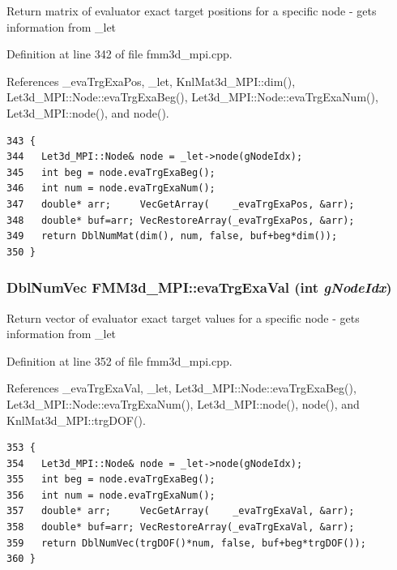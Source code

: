 Return matrix of evaluator exact target positions for a specific node - gets information from \_\-let 

Definition at line 342 of file fmm3d\_\-mpi.cpp.

References \_\-eva\-Trg\-Exa\-Pos, \_\-let, Knl\-Mat3d\_\-MPI::dim(), Let3d\_\-MPI::Node::eva\-Trg\-Exa\-Beg(), Let3d\_\-MPI::Node::eva\-Trg\-Exa\-Num(), Let3d\_\-MPI::node(), and node().

\footnotesize\begin{verbatim}343 {
344   Let3d_MPI::Node& node = _let->node(gNodeIdx);
345   int beg = node.evaTrgExaBeg();
346   int num = node.evaTrgExaNum();
347   double* arr;     VecGetArray(    _evaTrgExaPos, &arr);
348   double* buf=arr; VecRestoreArray(_evaTrgExaPos, &arr);
349   return DblNumMat(dim(), num, false, buf+beg*dim());
350 }
\end{verbatim}\normalsize 


\subsubsection{\setlength{\rightskip}{0pt plus 5cm}Dbl\-Num\-Vec FMM3d\_\-MPI::eva\-Trg\-Exa\-Val (int {\em g\-Node\-Idx})\hspace{0.3cm}{\tt  [protected]}}\label{classFMM3d__MPI_3ea3c7087a28b8d102c797d796aed4c2_3ea3c7087a28b8d102c797d796aed4c2}


Return vector of evaluator exact target values for a specific node - gets information from \_\-let 

Definition at line 352 of file fmm3d\_\-mpi.cpp.

References \_\-eva\-Trg\-Exa\-Val, \_\-let, Let3d\_\-MPI::Node::eva\-Trg\-Exa\-Beg(), Let3d\_\-MPI::Node::eva\-Trg\-Exa\-Num(), Let3d\_\-MPI::node(), node(), and Knl\-Mat3d\_\-MPI::trg\-DOF().

\footnotesize\begin{verbatim}353 {
354   Let3d_MPI::Node& node = _let->node(gNodeIdx);
355   int beg = node.evaTrgExaBeg();
356   int num = node.evaTrgExaNum();
357   double* arr;     VecGetArray(    _evaTrgExaVal, &arr);
358   double* buf=arr; VecRestoreArray(_evaTrgExaVal, &arr);
359   return DblNumVec(trgDOF()*num, false, buf+beg*trgDOF());
360 }
\end{verbatim}\normalsize 


